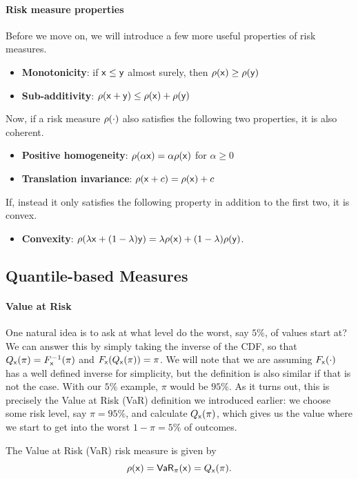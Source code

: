 \paragraph{Risk measure properties} Before we move on, we will introduce a few more useful properties of risk measures.
\begin{itemize}
    \item \textbf{Monotonicity}: if $\mathsf x\le\mathsf y$ almost surely, then $\rs\rx \ge \rs\ry$
    \item \textbf{Sub-additivity}: $\rs{\rx+\ry}\le \rs\rx+\rs\ry$
\end{itemize}
Now, if a risk measure $\rsd$ also satisfies the following two properties, it is also coherent.
\begin{itemize}
    \item \textbf{Positive homogeneity}: $\rs{\alpha\rx}=\alpha\rs\rx$ for $\alpha\ge 0$
    \item \textbf{Translation invariance}: $\rs{\rx+c} = \rs\rx+c$
\end{itemize}
If, instead it only satisfies the following property in addition to the first two, it is convex.
\begin{itemize}
    \item \textbf{Convexity}: $\rs{\lambda\rx+(1-\lambda)\ry}=\lambda \rs\rx+(1-\lambda)\rs\ry$.
\end{itemize}

\subsection{Quantile-based Measures}

\paragraph{Value at Risk} One natural idea is to ask at what level do the worst, say $5\%$, of values start at? We can answer this by simply taking the inverse of the CDF, so that $\Qxd{\pi} = \Fxdinv{\pi}$ and $\Fxd{\Qxd{\pi}} = \pi$. We will note that we are assuming $\Fxdd$ has a well defined inverse for simplicity, but the definition is also similar if that is not the case. With our $5\%$ example, $\pi$ would be $95\%$. As it turns out, this is precisely the Value at Risk (VaR) definition we introduced earlier: we choose some risk level, say $\pi=95\%$, and calculate $\Qxd{\pi}$, which gives us the value where we start to get into the worst $1-\pi=5\%$ of outcomes.

\begin{definition}
    The Value at Risk (VaR) risk measure is given by
    \begin{equation}
        \rs{\rx} = \VaR{\pi}{\rx} = \Qxd{\pi}.
    \end{equation}
\end{definition}

